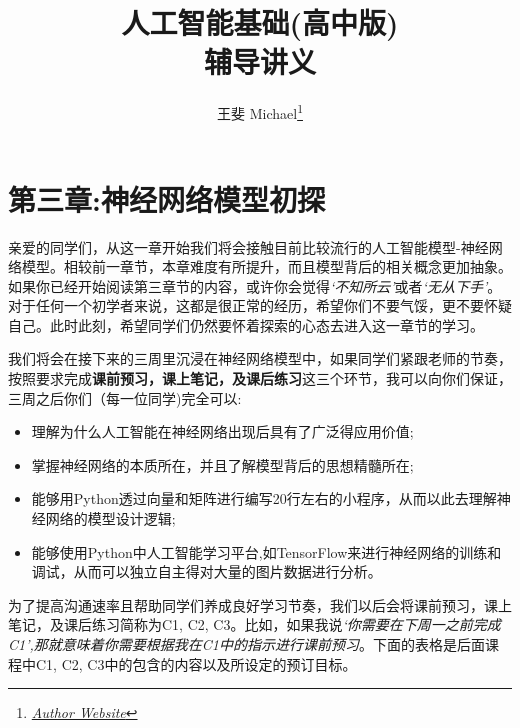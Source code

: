 \documentclass[12pt]{article}
\title{{\Huge 人工智能基础(高中版)}\\{\Large{辅导讲义}}}
\author{王斐 Michael\footnote{\href{https://www.michaelyunfei.com}{\textit{Author Website}}}}
\affiliation{School of Mathematics and Statistics, UCD}
\numberwithin{equation}{section}
\begin{document}
  \maketitle
  \flushbottom
  \newpage
  \pagestyle{fancynotes}



\setcounter{part}{2}

\part*{第三章:神经网络模型初探}


亲爱的同学们，从这一章开始我们将会接触目前比较流行的人工智能模型-神经网络模型。相较前一章节，本章难度有所提升，而且模型背后的相关概念更加抽象。如果你已经开始阅读第三章节的内容，或许你会觉得\textit{`不知所云'}或者\textit{`无从下手'}。 对于任何一个初学者来说，这都是很正常的经历，希望你们不要气馁，更不要怀疑自己。此时此刻，希望同学们仍然要怀着探索的心态去进入这一章节的学习。

我们将会在接下来的三周里沉浸在神经网络模型中，如果同学们紧跟老师的节奏，按照要求完成\textbf{课前预习，课上笔记，及课后练习}这三个环节，我可以向你们保证，三周之后你们（每一位同学)完全可以:
\begin{itemize}
	\item 理解为什么人工智能在神经网络出现后具有了广泛得应用价值;
	\item 掌握神经网络的本质所在，并且了解模型背后的思想精髓所在;
	\item 能够用Python透过向量和矩阵进行编写20行左右的小程序，从而以此去理解神经网络的模型设计逻辑;
	\item 能够使用Python中人工智能学习平台,如TensorFlow来进行神经网络的训练和调试，从而可以独立自主得对大量的图片数据进行分析。
\end{itemize}


为了提高沟通速率且帮助同学们养成良好学习节奏，我们以后会将课前预习，课上笔记，及课后练习简称为C1, C2, C3。比如，如果我说\textit{`你需要在下周一之前完成C1',那就意味着你需要根据我在C1中的指示进行课前预习}。下面的表格是后面课程中C1, C2, C3中的包含的内容以及所设定的预订目标。
\end{document}
